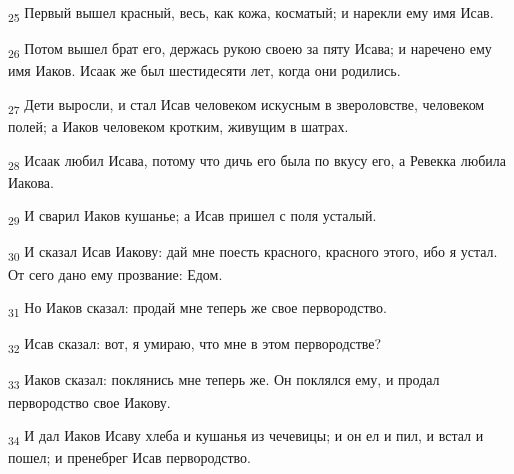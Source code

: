 \begin{tcolorbox}
\textsubscript{25} Первый вышел красный, весь, как кожа, косматый; и нарекли ему имя Исав.
\end{tcolorbox}
\begin{tcolorbox}
\textsubscript{26} Потом вышел брат его, держась рукою своею за пяту Исава; и наречено ему имя Иаков. Исаак же был шестидесяти лет, когда они родились.
\end{tcolorbox}
\begin{tcolorbox}
\textsubscript{27} Дети выросли, и стал Исав человеком искусным в звероловстве, человеком полей; а Иаков человеком кротким, живущим в шатрах.
\end{tcolorbox}
\begin{tcolorbox}
\textsubscript{28} Исаак любил Исава, потому что дичь его была по вкусу его, а Ревекка любила Иакова.
\end{tcolorbox}
\begin{tcolorbox}
\textsubscript{29} И сварил Иаков кушанье; а Исав пришел с поля усталый.
\end{tcolorbox}
\begin{tcolorbox}
\textsubscript{30} И сказал Исав Иакову: дай мне поесть красного, красного этого, ибо я устал. От сего дано ему прозвание: Едом.
\end{tcolorbox}
\begin{tcolorbox}
\textsubscript{31} Но Иаков сказал: продай мне теперь же свое первородство.
\end{tcolorbox}
\begin{tcolorbox}
\textsubscript{32} Исав сказал: вот, я умираю, что мне в этом первородстве?
\end{tcolorbox}
\begin{tcolorbox}
\textsubscript{33} Иаков сказал: поклянись мне теперь же. Он поклялся ему, и продал первородство свое Иакову.
\end{tcolorbox}
\begin{tcolorbox}
\textsubscript{34} И дал Иаков Исаву хлеба и кушанья из чечевицы; и он ел и пил, и встал и пошел; и пренебрег Исав первородство.
\end{tcolorbox}
